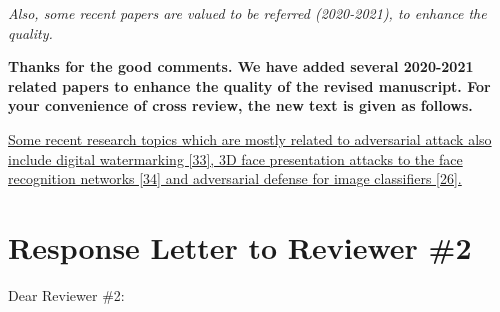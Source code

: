 \documentclass[12pt]{article}
\begin{document}
\textit{Also, some recent papers are valued to be referred (2020-2021), to enhance the quality.}

\textbf{Thanks for the good comments. We have added several 2020-2021 related papers to enhance the quality of the revised manuscript. For your convenience of cross review, the new text is given as follows.}

\uline{Some recent research topics which are mostly related to adversarial attack also include digital watermarking [33], 3D face presentation attacks to the face recognition networks [34] and adversarial defense for image classifiers [26].
}

\newpage
{\centering\section*{Response Letter to Reviewer \#2}}
\noindent Dear Reviewer \#2:
\end{document}
